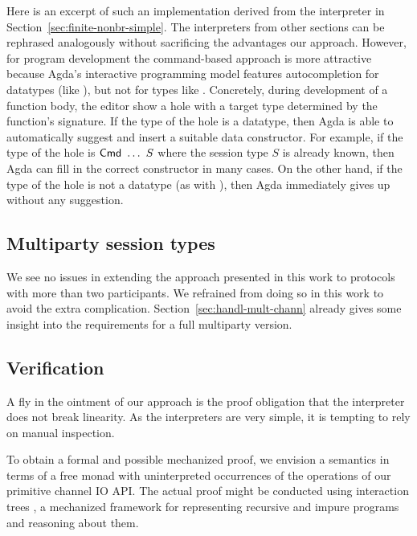 \documentclass[acmsmall,review,anonymous,screen]{acmart}
\begin{document}
Here is an excerpt of such an implementation derived from the
interpreter in Section~\ref{sec:finite-nonbr-simple}.
\stCombinators
The interpreters from other sections can be rephrased analogously
without sacrificing the advantages our approach. However, for program
development the command-based approach is more attractive because 
Agda's interactive programming model features autocompletion for
datatypes (like {\ACommand}), but not for types like {\AXCommand}.
Concretely, during development of a function body, the editor show a
hole with a target type determined by the function's signature. If the
type of the hole is a datatype, then Agda is able to automatically
suggest and insert a suitable data constructor. For example, if the
type of the hole is {$\ACommand\ \dots\ S$} where the session type $S$
is already known, then Agda can fill in the correct constructor in
many cases. On the other hand, if the type of the hole is not a
datatype (as with {\AXCommand}), then Agda
immediately gives up without any suggestion. 

\subsection{Multiparty session types}
\label{sec:mult-sess-types}

We see no issues in extending the approach presented in this work to
protocols with more than two participants. We refrained from doing so
in this work to avoid the extra
complication. Section~\ref{sec:handl-mult-chann} already gives some
insight into the requirements for a full multiparty version.

\subsection{Verification}
\label{sec:verification}

A fly in the ointment of our approach is the proof obligation that
the interpreter does not break linearity. As the interpreters are very
simple, it is tempting to rely on manual inspection.

To obtain a formal and possible mechanized proof, we envision a
semantics in terms of a free monad
\cite{DBLP:journals/jfp/Swierstra08,DBLP:conf/haskell/KiselyovI15}
with uninterpreted occurrences of 
the operations of our primitive channel IO API. The actual proof might be
conducted using interaction trees
\cite{DBLP:journals/pacmpl/XiaZHHMPZ20}, a mechanized framework for
representing recursive and impure programs and  reasoning about them.
\end{document}
